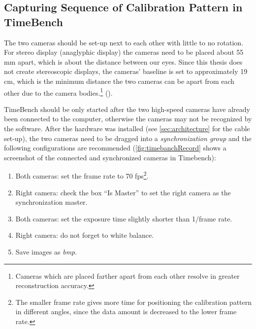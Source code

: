 \subsection{Capturing Sequence of Calibration Pattern in TimeBench}\label{ssec:PatternSequence}
The two cameras should be set-up next to each other with little to no rotation. For stereo display (anaglyphic display) the cameras need to be placed about 55 mm apart, which is about the distance between our eyes. Since this thesis does not create stereoscopic displays, the cameras' baseline is set to approximately 19 cm, which is the minimum distance the two cameras can be apart from each other due to the camera bodies.\footnote{Cameras which are placed farther apart from each other resolve in greater reconstruction accuracy.} (\cite{StereoCalib.2016}).  

TimeBench should be only started after the two high-speed cameras have already been connected to the computer, otherwise the cameras may not be recognized by the software. After the hardware was installed (see \autoref{sec:architecture} for the cable set-up), the two cameras need to be dragged into a \textit{synchronization group} and the following configurations are recommended (\autoref{fig:timebanchRecord} shows a screenshot of the connected and synchronized cameras in Timebench): 

\begin{enumerate}[i]
\item Both cameras: set the frame rate to 70 fps\footnote{The smaller frame rate gives more time for positioning the calibration pattern in different angles, since the data amount is decreased to the lower frame rate.}.
\item Right camera: check the box \enquote{Is Master} to set the right camera as the synchronization master.
\item Both cameras: set the exposure time slightly shorter than 1/frame rate.
\item Right camera: do not forget to white balance.
\item Save images as \textit{bmp}.
\end{enumerate}

